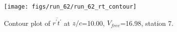 \begin{figure}[H]
\centering
\texttt{[image: figs/run\_62/run\_62\_rt\_contour]}
\caption{Contour plot of $\overline{r^\prime t^\prime}$ at $z/c$=10.00, $V_{free}$=16.98, station 7.}
\end{figure}



